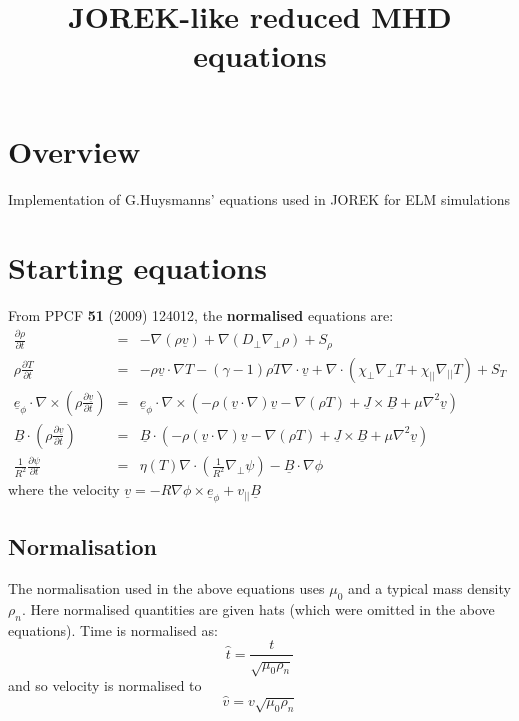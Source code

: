\documentclass[12pt]{article}
\newcommand{\deriv}[2]{\ensuremath{\frac{\partial #1}{\partial #2}}}
\begin{document}
\title{JOREK-like reduced MHD equations}

\maketitle

\section{Overview}

Implementation of G.Huysmanns' equations used in JOREK for ELM simulations

\section{Starting equations}

From PPCF {\bf 51} (2009) 124012, the {\bf normalised} equations are:
\begin{eqnarray*}
  \deriv{\rho}{t} &=& -\nabla\left(\rho\underline{v}\right) + \nabla\left(D_\perp\nabla_\perp\rho\right) + S_\rho \\
  \rho\deriv{T}{t} &=& -\rho\underline{v}\cdot\nabla T - \left(\gamma - 1\right)\rho T\nabla\cdot\underline{v} + \nabla\cdot\left(\chi_\perp\nabla_\perp T + \chi_{||}\nabla_{||}T\right) + S_T \\
  \underline{e}_\phi\cdot\nabla\times\left(\rho\deriv{\underline{v}}{t}\right) &=& \underline{e}_\phi\cdot\nabla\times\left(-\rho\left(\underline{v}\cdot\nabla\right)\underline{v} - \nabla\left(\rho T\right) + \underline{J}\times\underline{B} + \mu\nabla^2\underline{v}\right) \\
  \underline{B}\cdot\left(\rho\deriv{\underline{v}}{t}\right) &=& \underline{B}\cdot\left(-\rho\left(\underline{v}\cdot\nabla\right)\underline{v} - \nabla\left(\rho T\right) + \underline{J}\times\underline{B} + \mu\nabla^2\underline{v}\right) \\
  \frac{1}{R^2}\deriv{\psi}{t} &=& \eta\left(T\right)\nabla\cdot\left(\frac{1}{R^2}\nabla_\perp\psi\right) - \underline{B}\cdot\nabla \phi
\end{eqnarray*}
where the velocity $\underline{v} = -R\nabla\phi\times\underline{e}_\phi + v_{||}\underline{B}$

\subsection{Normalisation}

The normalisation used in the above equations uses $\mu_0$ and 
a typical mass density $\rho_n$. Here normalised quantities are given hats
(which were omitted in the above equations). Time is normalised as:
\[
\hat{t} = \frac{t}{\sqrt{\mu_0\rho_n}}
\]
and so velocity is normalised to
\[
\hat{v} = v\sqrt{\mu_0\rho_n}
\]
\end{document}
